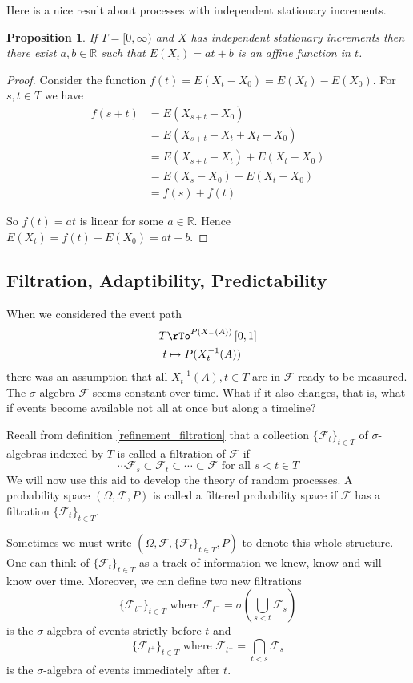 \documentclass[12pt]{amsart}
\newtheorem{proposition}[theorem]{Proposition}
\theoremstyle{definition}
\begin{document}
Here is a nice result about processes with independent stationary increments.

\begin{proposition} If $T = [0, \infty)$ and $X$ has independent stationary increments then there exist $a, b \in \mathbb{R}$ such that $E(X_t) = at + b$ is an affine function in $t$.
\end{proposition}
\begin{proof} Consider the function $f(t) = E(X_t - X_0) = E(X_t) - E(X_0)$. For $s, t \in T$ we have
\begin{align*}
f(s+t) & = E(X_{s+t} - X_0) \\
 & = E(X_{s+t} - X_t + X_t - X_0) \\
 & = E(X_{s+t} - X_t) + E(X_t - X_0) \\
 & = E(X_s - X_0) + E(X_t - X_0) \\
 & = f(s) + f(t)
\end{align*}

So $f(t) = at$ is linear for some $a \in \mathbb{R}$. Hence $E(X_t) = f(t) + E(X_0) = at + b$.
\end{proof}

\subsection{Filtration, Adaptibility, Predictability} When we considered the event path
\begin{align*}
T & \rTo^{P(X_{-}(A))} \left[ 0,1 \right] \\
t & \mapsto P(X^{-1}_t(A))
\end{align*}
there was an assumption that all $X^{-1}_t(A), t \in T$ are in $\mathcal{F}$ ready to be measured. The $\sigma$-algebra $\mathcal{F}$ seems constant over time. What if it also changes, that is, what if events become available not all at once but along a timeline?

Recall from definition \ref{refinement_filtration} that a collection $\{\mathcal{F}_t\}_{t \in T}$ of $\sigma$-algebras indexed by $T$ is called a filtration of $\mathcal{F}$ if
$$\cdots \mathcal{F}_s \subset \mathcal{F}_t \subset \cdots \subset \mathcal{F} \text{ for all } s < t \in T$$
We will now use this aid to develop the theory of random processes.
\dfn A probability space $(\Omega, \mathcal{F}, P)$ is called a filtered probability space if $\mathcal{F}$ has a filtration $\{\mathcal{F}_t\}_{t \in T}$.

Sometimes we must write $(\Omega, \mathcal{F}, \{\mathcal{F}_t\}_{t \in T}, P)$ to denote this whole structure. One can think of $\{\mathcal{F}_t\}_{t \in T}$ as a track of information we knew, know and will know over time. Moreover, we can define two new filtrations
$$\{\mathcal{F}_{t^-}\}_{t \in T} \text{ where } \mathcal{F}_{t^-} = \sigma(\bigcup\limits_{s < t} \mathcal{F}_s)$$
is the $\sigma$-algebra of events strictly before $t$ and
$$\{\mathcal{F}_{t^+}\}_{t \in T} \text{ where } \mathcal{F}_{t^+} = \bigcap\limits_{t < s} \mathcal{F}_s$$
is the $\sigma$-algebra of events immediately after $t$.
\end{document}
